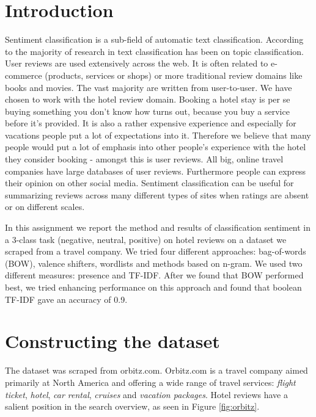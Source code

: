 \documentclass{article}
\begin{document}

\pagestyle{fancy}
\lhead{}
\chead{\leftmark}
\rhead{}
\cfoot{}

\tableofcontents
\vfill

\section{Introduction}

Sentiment classification is a sub-field of automatic text classification. According to \cite{pangetal} the majority of research in text classification has been on topic classification. User reviews are used extensively across the web. It is often related to e-commerce (products, services or shops) or more traditional review domains like books and movies. The vast majority are written from user-to-user. We have chosen to work with the hotel review domain. Booking a hotel stay is per se buying something you don’t know how turns out, because you buy a service before it’s provided. It is also a rather expensive experience and especially for vacations people put a lot of expectations into it. Therefore we believe that many people would put a lot of emphasis into other people’s experience with the hotel they consider booking - amongst this is user reviews. All big, online travel companies have large databases of user reviews. Furthermore people can express their opinion on other social media.  Sentiment classification can be useful for summarizing reviews across many different types of sites when ratings are absent or on different scales. 
\smallskip

In this assignment we report the method and results of classification sentiment in a 3-class task (negative, neutral, positive) on hotel reviews on a dataset we scraped from a travel company. We tried four different approaches: bag-of-words (BOW), valence shifters, wordlists and methods based on n-gram. We used two different measures: presence and TF-IDF. After we found that BOW performed best, we tried enhancing performance on this approach and found that boolean TF-IDF gave an accuracy of 0.9. 

\section{Constructing the dataset}
The dataset was scraped from orbitz.com. Orbitz.com is a travel company aimed primarily at North America and offering a wide range of travel services: \textit{flight ticket}, \textit{hotel}, \textit{car rental}, \textit{cruises} and \textit{vacation packages}. Hotel reviews have a salient position in the search overview, as seen in Figure \ref{fig:orbitz}. 
\end{document}
